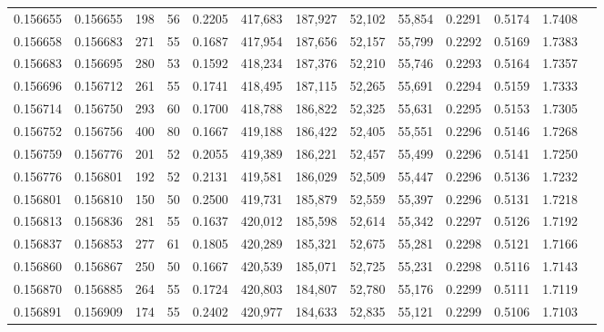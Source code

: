\begin{tabular}{rrrrrrrrrrrrr}
0.156655 & 0.156655 &   198 &  56 &                                     0.2205 & 417,683 & 187,927 &  52,102 &  55,854 & 0.2291 & 0.5174 & 1.7408 \\
0.156658 & 0.156683 &   271 &  55 &                                     0.1687 & 417,954 & 187,656 &  52,157 &  55,799 & 0.2292 & 0.5169 & 1.7383 \\
0.156683 & 0.156695 &   280 &  53 &                                     0.1592 & 418,234 & 187,376 &  52,210 &  55,746 & 0.2293 & 0.5164 & 1.7357 \\
0.156696 & 0.156712 &   261 &  55 &                                     0.1741 & 418,495 & 187,115 &  52,265 &  55,691 & 0.2294 & 0.5159 & 1.7333 \\
0.156714 & 0.156750 &   293 &  60 &                                     0.1700 & 418,788 & 186,822 &  52,325 &  55,631 & 0.2295 & 0.5153 & 1.7305 \\
0.156752 & 0.156756 &   400 &  80 &                                     0.1667 & 419,188 & 186,422 &  52,405 &  55,551 & 0.2296 & 0.5146 & 1.7268 \\
0.156759 & 0.156776 &   201 &  52 &                                     0.2055 & 419,389 & 186,221 &  52,457 &  55,499 & 0.2296 & 0.5141 & 1.7250 \\
0.156776 & 0.156801 &   192 &  52 &                                     0.2131 & 419,581 & 186,029 &  52,509 &  55,447 & 0.2296 & 0.5136 & 1.7232 \\
0.156801 & 0.156810 &   150 &  50 &                                     0.2500 & 419,731 & 185,879 &  52,559 &  55,397 & 0.2296 & 0.5131 & 1.7218 \\
0.156813 & 0.156836 &   281 &  55 &                                     0.1637 & 420,012 & 185,598 &  52,614 &  55,342 & 0.2297 & 0.5126 & 1.7192 \\
0.156837 & 0.156853 &   277 &  61 &                                     0.1805 & 420,289 & 185,321 &  52,675 &  55,281 & 0.2298 & 0.5121 & 1.7166 \\
0.156860 & 0.156867 &   250 &  50 &                                     0.1667 & 420,539 & 185,071 &  52,725 &  55,231 & 0.2298 & 0.5116 & 1.7143 \\
0.156870 & 0.156885 &   264 &  55 &                                     0.1724 & 420,803 & 184,807 &  52,780 &  55,176 & 0.2299 & 0.5111 & 1.7119 \\
0.156891 & 0.156909 &   174 &  55 &                                     0.2402 & 420,977 & 184,633 &  52,835 &  55,121 & 0.2299 & 0.5106 & 1.7103 \\

\end{tabular}
